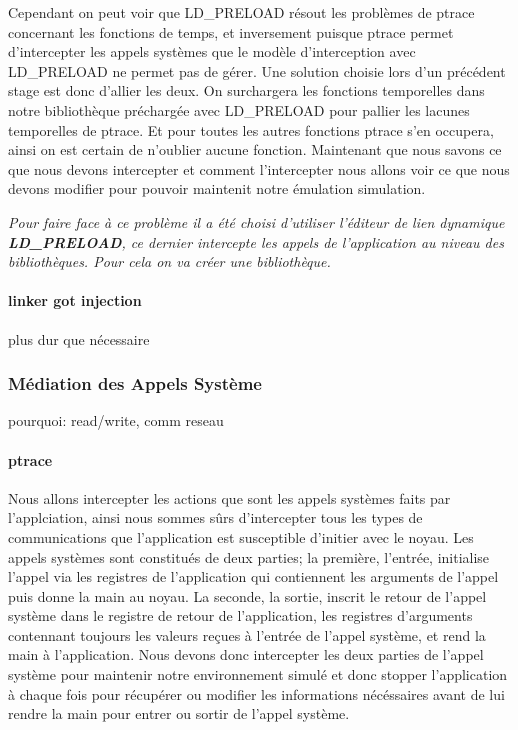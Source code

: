 Cependant on peut voir que LD\_PRELOAD résout les problèmes de ptrace concernant
les fonctions de temps, et inversement puisque ptrace permet d'intercepter les
appels systèmes que le modèle d'interception avec LD\_PRELOAD ne permet pas de
gérer. Une solution choisie lors d'un précédent stage est donc d'allier les
deux. On surchargera les fonctions temporelles dans notre bibliothèque
préchargée avec LD\_PRELOAD pour pallier les lacunes temporelles de ptrace. Et
pour toutes les autres fonctions ptrace s'en occupera, ainsi on est certain de
n'oublier aucune fonction. Maintenant que nous savons ce que nous devons
intercepter et comment l'intercepter nous allons voir ce que nous devons
modifier pour pouvoir maintenit notre émulation simulation.

\textit{Pour faire face à ce problème il a été choisi d'utiliser l'éditeur de
  lien dynamique \textbf{LD\_PRELOAD}, ce dernier intercepte les appels de
  l'application au niveau des bibliothèques. Pour cela on va créer une
  bibliothèque.}

\paragraph{linker got injection}
plus dur que nécessaire

\subsubsection{Médiation des Appels Système}
pourquoi: read/write, comm reseau

\paragraph{ptrace}
Nous allons intercepter les actions que sont les appels systèmes faits par
l'applciation, ainsi nous sommes sûrs d'intercepter tous les types de
communications que l'application est susceptible d'initier avec le noyau. Les
appels systèmes sont constitués de deux parties; la première, l'entrée,
initialise l'appel via les registres de l'application qui contiennent les
arguments de l'appel puis donne la main au noyau. La seconde, la sortie, inscrit
le retour de l'appel système dans le registre de retour de l'application, les
registres d'arguments contennant toujours les valeurs reçues à l'entrée de
l'appel système, et rend la main à l'application. Nous devons donc intercepter
les deux parties de l'appel système pour maintenir notre environnement simulé et
donc stopper l'application à chaque fois pour récupérer ou modifier les
informations nécéssaires avant de lui rendre la main pour entrer ou sortir de
l'appel système.


